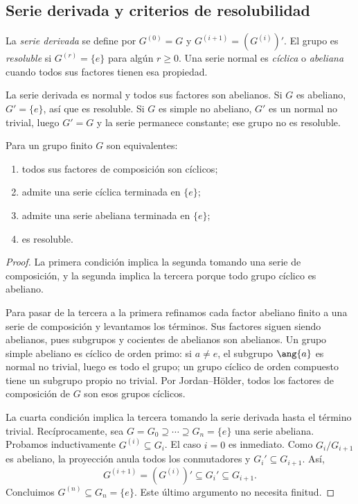 \subsection{Serie derivada y criterios de resolubilidad}
\begin{defi}
La \emph{serie derivada} se define por $G^{(0)}=G$ y $G^{(i+1)}=(G^{(i)})'$. El grupo es \emph{resoluble} si $G^{(r)}=\{e\}$ para algún $r\ge0$. Una serie normal es \emph{cíclica} o \emph{abeliana} cuando todos sus factores tienen esa propiedad.
\end{defi}
La serie derivada es normal y todos sus factores son abelianos. Si $G$ es abeliano, $G'=\{e\}$, así que es resoluble. Si $G$ es simple no abeliano, $G'$ es un normal no trivial, luego $G'=G$ y la serie permanece constante; ese grupo no es resoluble.

\begin{prop}\label{prop:C8-resoluble}
Para un grupo finito $G$ son equivalentes:
\begin{enumerate}[nosep]
\item todos sus factores de composición son cíclicos;
\item admite una serie cíclica terminada en $\{e\}$;
\item admite una serie abeliana terminada en $\{e\}$;
\item es resoluble.
\end{enumerate}
\end{prop}
\begin{proof}
La primera condición implica la segunda tomando una serie de composición, y la segunda implica la tercera porque todo grupo cíclico es abeliano.

Para pasar de la tercera a la primera refinamos cada factor abeliano finito a una serie de composición y levantamos los términos. Sus factores siguen siendo abelianos, pues subgrupos y cocientes de abelianos son abelianos. Un grupo simple abeliano es cíclico de orden primo: si $a\ne e$, el subgrupo $\ang{a}$ es normal no trivial, luego es todo el grupo; un grupo cíclico de orden compuesto tiene un subgrupo propio no trivial. Por Jordan--Hölder, todos los factores de composición de $G$ son esos grupos cíclicos.

La cuarta condición implica la tercera tomando la serie derivada hasta el término trivial. Recíprocamente, sea $G=G_0\supseteq\cdots\supseteq G_n=\{e\}$ una serie abeliana. Probamos inductivamente $G^{(i)}\subseteq G_i$. El caso $i=0$ es inmediato. Como $G_i/G_{i+1}$ es abeliano, la proyección anula todos los conmutadores y $G_i'\subseteq G_{i+1}$. Así,
\[
G^{(i+1)}=(G^{(i)})'\subseteq G_i'\subseteq G_{i+1}.
\]
Concluimos $G^{(n)}\subseteq G_n=\{e\}$. Este último argumento no necesita finitud.
\end{proof}

